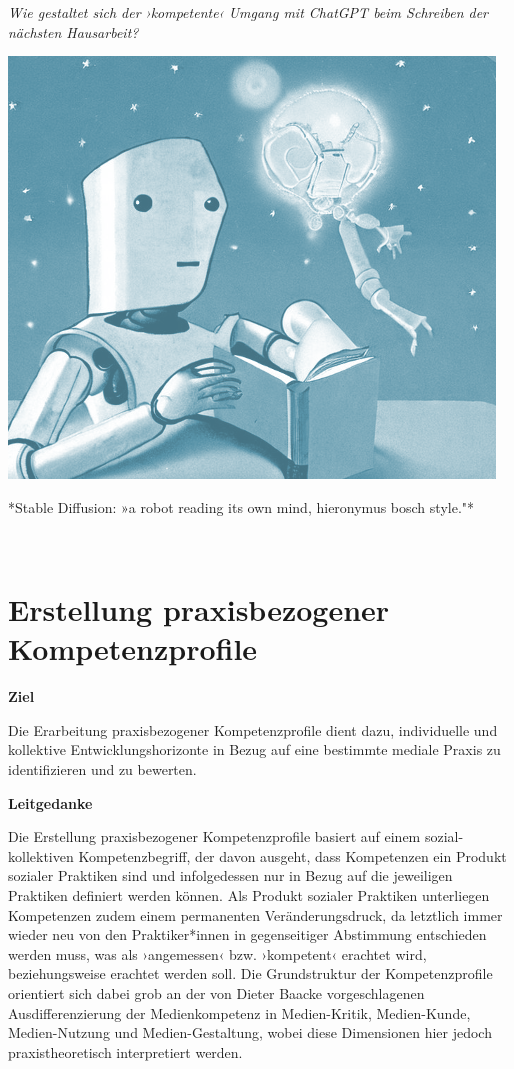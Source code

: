 \documentclass[
  a4paper,
]{book}
\begin{document}
\begin{blackbox}

\emph{Wie gestaltet sich der ›kompetente‹ Umgang mit ChatGPT beim Schreiben der nächsten Hausarbeit?}

\begin{center}\includegraphics{Figures/13-02-ChatGPT} \end{center}

\begin{center}
*Stable Diffusion: »a robot reading its own mind, hieronymus bosch style."*
\end{center}

\end{blackbox}

~

\section{Erstellung praxisbezogener Kompetenzprofile}\label{erstellung-praxisbezogener-kompetenzprofile}

\textbf{Ziel}

Die Erarbeitung praxisbezogener Kompetenzprofile dient dazu, individuelle und kollektive Entwicklungshorizonte in Bezug auf eine bestimmte mediale Praxis zu identifizieren und zu bewerten.

\textbf{Leitgedanke}

Die Erstellung praxisbezogener Kompetenzprofile basiert auf einem sozial-kollektiven Kompetenzbegriff, der davon ausgeht, dass Kompetenzen ein Produkt sozialer Praktiken sind und infolgedessen nur in Bezug auf die jeweiligen Praktiken definiert werden können. Als Produkt sozialer Praktiken unterliegen Kompetenzen zudem einem permanenten Veränderungsdruck, da letztlich immer wieder neu von den Praktiker*innen in gegenseitiger Abstimmung entschieden werden muss, was als ›angemessen‹ bzw. ›kompetent‹ erachtet wird, beziehungsweise erachtet werden soll. Die Grundstruktur der Kompetenzprofile orientiert sich dabei grob an der von Dieter Baacke vorgeschlagenen Ausdifferenzierung der Medienkompetenz in Medien-Kritik, Medien-Kunde, Medien-Nutzung und Medien-Gestaltung, wobei diese Dimensionen hier jedoch praxistheoretisch interpretiert werden.
\end{document}
